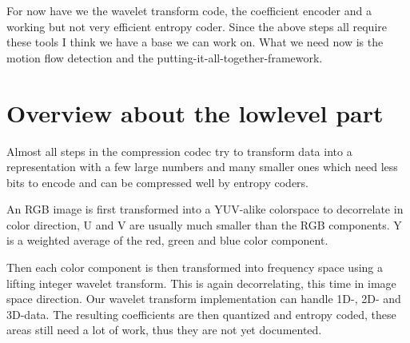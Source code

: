 For now have we the wavelet transform code, the coefficient encoder and a 
working but not very efficient entropy coder. Since the above steps all require
these tools I think we have a base we can work on. What we need now is the 
motion flow detection and the putting-it-all-together-framework.


\section{ Overview about the lowlevel part }

Almost all steps in the compression codec try to transform data into a 
representation with a few large numbers and many smaller ones which need
less bits to encode and can be compressed well by entropy coders.

An RGB image is first transformed into a YUV-alike colorspace to decorrelate in
color direction, U and V are usually much smaller than the RGB components.
Y is a weighted average of the red, green and blue color component.

Then each color component is then transformed into frequency space using a 
lifting integer wavelet transform. This is again decorrelating, this time in 
image space direction. Our wavelet transform implementation can handle 1D-, 
2D- and 3D-data. The resulting coefficients are then quantized and entropy 
coded, these areas still need a lot of work, thus they are not yet documented.


